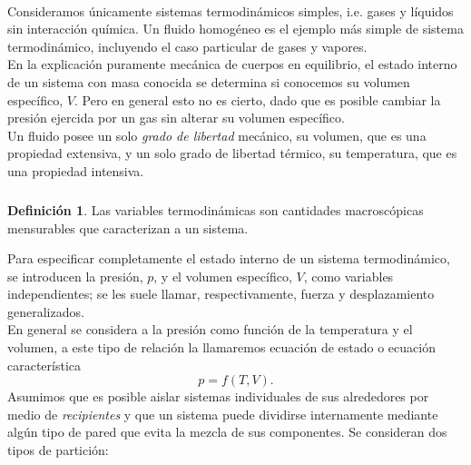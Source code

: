 \documentclass{article}
\theoremstyle{definition} \newtheorem{defi}{Definici\'on}
\theoremstyle{definition} \newtheorem{teo}{Teorema}
\theoremstyle{definition} \newtheorem{cor}{Corolario}
\begin{document}
\paragraph{}
Consideramos \'unicamente sistemas termodin\'amicos simples, i.e. gases y l\'iquidos sin interacci\'on qu\'imica. Un fluido homog\'eneo es el ejemplo m\'as simple de sistema termodin\'amico, incluyendo el caso particular de gases y vapores.\\
En la explicaci\'on puramente mec\'anica de cuerpos en equilibrio, el estado interno de un sistema con masa conocida se determina si conocemos su volumen espec\'ifico, $V.$ Pero en general esto no es cierto, dado que es posible cambiar la presi\'on ejercida por un gas sin alterar su volumen espec\'ifico.\\
Un fluido posee un solo \emph{grado de libertad} mec\'anico, su volumen, que es una propiedad extensiva, y un solo grado de libertad t\'ermico, su temperatura, que es una propiedad intensiva.
\subparagraph{}
\begin{defi}
Las variables termodin\'amicas son cantidades macrosc\'opicas mensurables que caracterizan a un sistema.
\end{defi}
Para especificar completamente el estado interno de un sistema termodin\'amico, se introducen la presi\'on, $p$, y el volumen espec\'ifico, $V$, como variables independientes; se les suele llamar, respectivamente, fuerza y desplazamiento generalizados.\\
En general se considera a la presi\'on como funci\'on de la temperatura y el volumen, a este tipo de relaci\'on la llamaremos ecuaci\'on de estado o ecuaci\'on caracter\'istica
\begin{equation}
p=f(T,V).
\end{equation}
Asumimos que es posible aislar sistemas individuales de sus alrededores por medio de \emph{recipientes} y que un sistema puede dividirse internamente mediante alg\'un tipo de pared que evita la mezcla de sus componentes. Se consideran dos tipos de partici\'on:
\end{document}
